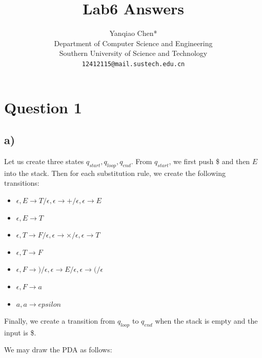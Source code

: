 \documentclass[a4paper, UTF-8]{article}
\theoremstyle{plain}
\begin{document}
\title{\bf{Lab6 Answers}}

\author{Yanqiao Chen*\\ 
  Department of Computer Science and Engineering\\
  Southern University of Science and Technology\\
  \texttt{12412115@mail.sustech.edu.cn}
  }

\maketitle

\section{Question 1} 

\subsection{a)} 

Let us create three states $q_{start}, q_{loop}, q_{end}$. From $q_{start} $, we first push \$ and then $E$ into the stack. Then for each substitution rule, we create the following transitions: 
\begin{itemize}
    \item $\epsilon, E \to T/\epsilon, \epsilon \to +/\epsilon, \epsilon \to E$ 
    \item $\epsilon, E \to T$ 
    \item $\epsilon, T \to F/ \epsilon, \epsilon \to \times/ \epsilon, \epsilon \to T$ 
    \item $\epsilon, T \to F$ 
    \item $\epsilon, F \to ) / \epsilon, \epsilon \to E/ \epsilon, \epsilon \to (/ \epsilon$
    \item $\epsilon, F \to a$ 
    \item $a, a \to epsilon$ 
\end{itemize} 
Finally, we create a transition from $q_{loop}$ to $q_{end}$ when the stack is empty and the input is \$.

We may draw the PDA as follows:
\end{document}
